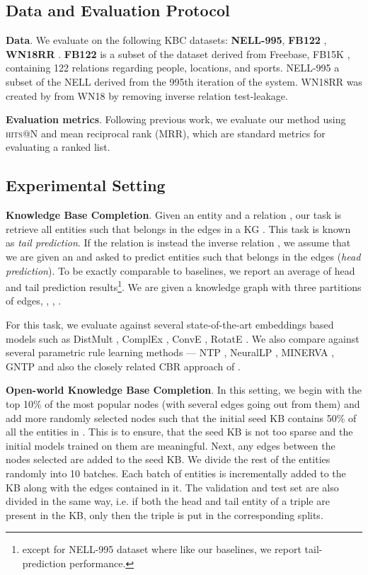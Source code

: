 \documentclass[11pt,a4paper]{article}
\newcommand{\nell}{NELL-995\xspace}
\begin{document}
\subsection{Data and Evaluation Protocol}
\label{sub:data_and_eval_protocols}

\textbf{Data}. We evaluate on the following KBC datasets: \textbf{NELL-995}, \textbf{FB122} \cite{guo2016jointly}, \textbf{WN18RR} \cite{dettmers2018convolutional}. \textbf{FB122} is a subset of the dataset derived from Freebase, FB15K \cite{bordes2013translating}, containing 122 relations regarding people, locations, and sports. {NELL-995} \cite{deeppath} a subset of the NELL derived from the 995th iteration of the system. WN18RR was created by \citet{dettmers2018convolutional} from WN18 by removing inverse relation test-leakage.


\textbf{Evaluation metrics}. Following previous work, we evaluate our method using \textsc{hits}@N and mean reciprocal rank (MRR), which are standard metrics for evaluating a ranked list.


\subsection{Experimental Setting}
\label{sub:experimental_setting}

\textbf{Knowledge Base Completion}. Given an entity  and a relation , our task is retrieve all entities  such that  belongs in the edges  in a KG . This task is known as \emph{tail prediction}. If the relation is instead the inverse relation , we assume that we are given an   and asked to predict entities  such that  belongs in the edges  (\emph{head prediction}). To be exactly comparable to baselines, we report an average of head and tail prediction results\footnote{except for \nell dataset where like our baselines, we report tail-prediction performance.}. We are given a knowledge graph with three partitions of edges, , , .

For this task, we evaluate against several state-of-the-art embeddings based models such as 
DistMult \cite{distmul}, ComplEx \cite{trouillon2016complex}, ConvE \cite{dettmers2018convolutional}, RotatE \cite{sun2019rotate}. We also compare against several parametric rule learning methods --- 
NTP \cite{ntp}, NeuralLP \cite{yang2017differentiable}, MINERVA \cite{das2018go}, GNTP \citep{minervini2019differentiable} and also the closely related CBR approach of \citet{cbr}.

\noindent \textbf{Open-world Knowledge Base Completion}. In this setting, we begin with the top 10\% of the most popular nodes (with several edges going out from them) and add more randomly selected nodes such that the initial seed KB contains 50\% of all the entities in . This is to ensure, that the seed KB is not too sparse and the initial models trained on them are meaningful. Next, any edges between the nodes selected are added to the seed KB. We divide the rest of the entities randomly into 10 batches. Each batch of entities is incrementally added to the KB along with the edges contained in it. The validation and test set are also divided in the same way, i.e. if both the head and tail entity of a triple are present in the KB, only then the triple is put in the corresponding splits.
\end{document}
